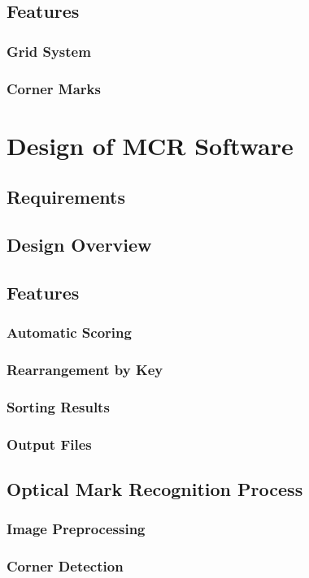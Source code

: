 \documentclass[12pt, letterpaper]{report}
\begin{document}
\section{Features}
\subsection{Grid System}
\subsection{Corner Marks}

\chapter{Design of MCR Software}
\section{Requirements}
\section{Design Overview}
\section{Features}
\subsection{Automatic Scoring}
\label{sect:scoring}
\subsection{Rearrangement by Key}
\subsection{Sorting Results}
\subsection{Output Files}
\section{Optical Mark Recognition Process}
\subsection{Image Preprocessing}
\subsection{Corner Detection}
\end{document}

